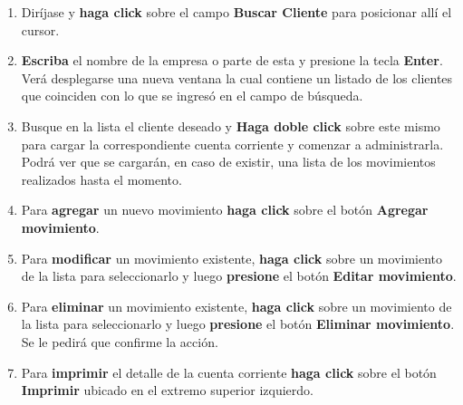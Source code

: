 \documentclass{book}
\begin{document}
\begin{enumerate}
	\itemsep=8pt \topsep=0pt \partopsep=0pt \parskip=0pt \parsep=0pt
	
	\item Diríjase y \textbf{haga click} sobre el campo \textbf{Buscar Cliente} para posicionar allí el cursor.

	\item \textbf{Escriba} el nombre de la empresa o parte de esta y presione la tecla \textbf{Enter}. Verá desplegarse una nueva ventana la cual contiene un listado de los clientes que coinciden con lo que se ingresó en el campo de búsqueda.

	\item Busque en la lista el cliente deseado y \textbf{Haga doble click} sobre este mismo para cargar la correspondiente cuenta corriente y comenzar a administrarla. Podrá ver que se cargarán, en caso de existir, una lista de los movimientos realizados hasta el momento.

	\item Para \textbf{agregar} un nuevo movimiento \textbf{haga click} sobre el botón \textbf{Agregar movimiento}.

	\item Para \textbf{modificar} un movimiento existente, \textbf{haga click} sobre un movimiento de la lista para seleccionarlo y luego \textbf{presione} el botón \textbf{Editar movimiento}.

	\item Para \textbf{eliminar} un movimiento existente, \textbf{haga click} sobre un movimiento de la lista para seleccionarlo y luego \textbf{presione} el botón \textbf{Eliminar movimiento}. Se le pedirá que confirme la acción.

	\item Para \textbf{imprimir} el detalle de la cuenta corriente \textbf{haga click} sobre el botón \textbf{Imprimir} ubicado en el extremo superior izquierdo.

\end{enumerate}
\medskip
\end{document}

